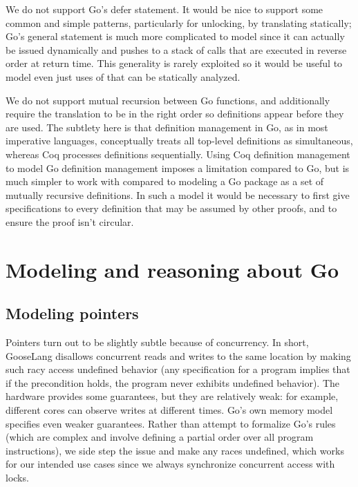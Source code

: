 We do not support Go's defer statement. It would be nice to support some
common and simple patterns, particularly for unlocking, by translating
 statically; Go's general  statement is much more
complicated to model since it can actually be issued dynamically and
pushes to a stack of calls that are executed in reverse order at return
time. This generality is rarely exploited so it would be useful to model even
just uses of  that can be statically analyzed.

We do not support mutual recursion between Go functions, and
additionally require the translation to be in the right order so
definitions appear before they are used. The subtlety here is that
definition management in Go, as in most imperative languages,
conceptually treats all top-level definitions as simultaneous, whereas
Coq processes definitions sequentially. Using Coq definition management
to model Go definition management imposes a limitation compared to Go,
but is much simpler to work with compared to modeling a Go package as a
set of mutually recursive definitions. In such a model it would be
necessary to first give specifications to every definition that may be
assumed by other proofs, and to ensure the proof isn't circular.

\section{Modeling and reasoning about Go}

\subsection{Modeling pointers}

Pointers turn out to be slightly subtle because of concurrency. In
short, GooseLang disallows concurrent reads and writes to the same
location by making such racy access undefined behavior (any
specification for a program implies that if the precondition holds, the
program never exhibits undefined behavior). The hardware provides some
guarantees, but they are relatively weak: for example, different cores
can observe writes at different times. Go's own memory model specifies
even weaker guarantees. Rather than attempt to formalize Go's rules
(which are complex and involve defining a partial order over all program
instructions), we side step the issue and make any races undefined,
which works for our intended use cases since we always synchronize
concurrent access with locks.

